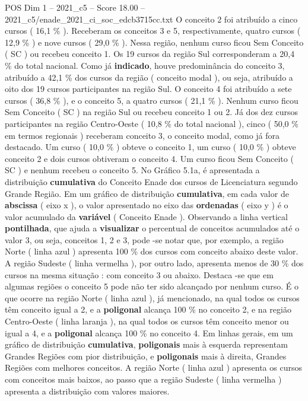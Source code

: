 \begin{textsample}{POS Dim 1 – 2021\_c5 – Score 18.00 – 2021\_c5/enade\_2021\_ci\_soc\_edcb3715cc.txt}
O conceito 2 foi atribuído a cinco cursos ( 16,1 \% ).
Receberam os conceitos 3 e 5, respectivamente, quatro cursos ( 12,9 \% ) e nove cursos ( 29,0 \% ).
Nessa região, nenhum curso ficou Sem Conceito ( SC ) ou recebeu conceito 1.
Os 19 cursos da região Sul corresponderam a 20,4 \% do total nacional.
Como já \textbf{indicado}, houve predominância do conceito 3, atribuído a 42,1 \% dos cursos da região ( conceito modal ), ou seja, atribuído a oito dos 19 cursos participantes na região Sul.
O conceito 4 foi atribuído a sete cursos ( 36,8 \% ), e o conceito 5, a quatro cursos ( 21,1 \% ).
Nenhum curso ficou Sem Conceito ( SC ) na região Sul ou recebeu conceito 1 ou 2.
Já dos dez cursos participantes na região Centro-Oeste ( 10,8 \% do total nacional ), cinco ( 50,0 \% em termos regionais ) receberam conceito 3, o conceito modal, como já fora destacado.
Um curso ( 10,0 \% ) obteve o conceito 1, um curso ( 10,0 \% ) obteve conceito 2 e dois cursos obtiveram o conceito 4.
Um curso ficou Sem Conceito ( SC ) e nenhum recebeu o conceito 5.
No Gráfico 5.1a, é apresentada a distribuição \textbf{cumulativa} do Conceito Enade dos cursos de Licenciatura segundo Grande Região.
Em um gráfico de distribuição \textbf{cumulativa}, em cada valor de \textbf{abscissa} ( eixo x ), o valor apresentado no eixo das \textbf{ordenadas} ( eixo y ) é o valor acumulado da \textbf{variável} ( Conceito Enade ).
Observando a linha vertical \textbf{pontilhada}, que ajuda a \textbf{visualizar} o percentual de conceitos acumulados até o valor 3, ou seja, conceitos 1, 2 e 3, pode -se notar que, por exemplo, a região Norte ( linha azul ) apresenta 100 \% dos cursos com conceito abaixo deste valor.
A região Sudeste ( linha vermelha ), por outro lado, apresenta menos de 30 \% dos cursos na mesma situação : com conceito 3 ou abaixo.
Destaca -se que em algumas regiões o conceito 5 pode não ter sido alcançado por nenhum curso.
É o que ocorre na região Norte ( linha azul ), já mencionado, na qual todos os cursos têm conceito igual a 2, e a \textbf{poligonal} alcança 100 \% no conceito 2, e na região Centro-Oeste ( linha laranja ), na qual todos os cursos têm conceito menor ou igual a 4, e a \textbf{poligonal} alcança 100 \% no conceito 4.
Em linhas gerais, em um gráfico de distribuição \textbf{cumulativa}, \textbf{poligonais} mais à esquerda representam Grandes Regiões com pior distribuição, e \textbf{poligonais} mais à direita, Grandes Regiões com melhores conceitos.
A região Norte ( linha azul ) apresenta os cursos com conceitos mais baixos, ao passo que a região Sudeste ( linha vermelha ) apresenta a distribuição com valores maiores.

\end{textsample}

